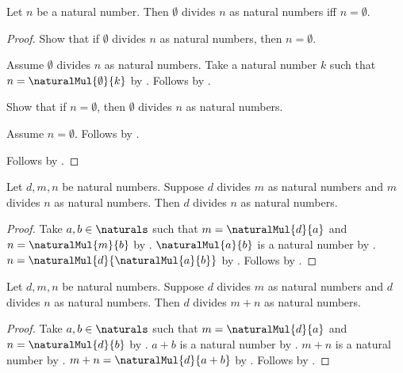 \begin{proposition}\label{spike15_zero_divides_natural_iff_zero}
    Let $n$ be a natural number.
    Then $\emptyset$ divides $n$ as natural numbers iff
        $n=\emptyset$.
\end{proposition}
\begin{proof}
    Show that if $\emptyset$ divides $n$ as natural numbers, then
        $n=\emptyset$.
    \begin{subproof}
        Assume $\emptyset$ divides $n$ as natural numbers.
        Take a natural number $k$ such that
            $n=\naturalMul{\emptyset}{k}$
            by .
        Follows by .
    \end{subproof}
    Show that if $n=\emptyset$, then
        $\emptyset$ divides $n$ as natural numbers.
    \begin{subproof}
        Assume $n=\emptyset$.
        Follows by .
    \end{subproof}
    Follows by \auto.
\end{proof}

\begin{proposition}\label{spike15_natural_divisibility_transitive}
    Let $d,m,n$ be natural numbers.
    Suppose $d$ divides $m$ as natural numbers and
        $m$ divides $n$ as natural numbers.
    Then $d$ divides $n$ as natural numbers.
\end{proposition}
\begin{proof}
    Take $a,b\in\naturals$ such that
        $m=\naturalMul{d}{a}$ and $n=\naturalMul{m}{b}$
        by .
    $\naturalMul{a}{b}$ is a natural number
        by .
    $n=\naturalMul{d}{\naturalMul{a}{b}}$
        by .
    Follows by .
\end{proof}

\begin{proposition}\label{spike15_common_divisor_divides_sum}
    Let $d,m,n$ be natural numbers.
    Suppose $d$ divides $m$ as natural numbers and
        $d$ divides $n$ as natural numbers.
    Then $d$ divides $m+n$ as natural numbers.
\end{proposition}
\begin{proof}
    Take $a,b\in\naturals$ such that
        $m=\naturalMul{d}{a}$ and $n=\naturalMul{d}{b}$
        by .
    $a+b$ is a natural number by .
    $m+n$ is a natural number by .
    $m+n=\naturalMul{d}{a+b}$
        by .
    Follows by .
\end{proof}

